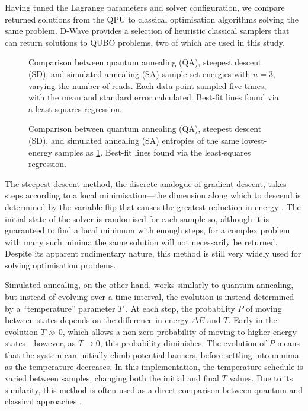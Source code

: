 \documentclass[12pt]{article}
\theoremstyle{definition}
\begin{document}
Having tuned the Lagrange parameters and solver configuration, we compare returned solutions from the QPU to classical optimisation algorithms solving the same problem. D-Wave provides a selection of heuristic classical samplers that can return solutions to QUBO problems, two of which are used in this study.

\begin{figure}[p]
    \centering\footnotesize
    
    \caption{Comparison between quantum annealing (QA), steepest descent (SD), and simulated annealing (SA) sample set energies with $n=3$, varying the number of reads. Each data point sampled five times, with the mean and standard error calculated. Best-fit lines found via a least-squares regression.}
    \label{fig:reads}
\end{figure}

\begin{figure}[p]
    \centering\footnotesize
    
    \caption{Comparison between quantum annealing (QA), steepest descent (SD), and simulated annealing (SA) entropies of the same lowest-energy samples as \cref{fig:reads}. Best-fit lines found via the least-squares regression.}
    \label{fig:entropy}
\end{figure}

The steepest descent method, the discrete analogue of gradient descent, takes steps according to a local minimisation---the dimension along which to descend is determined by the variable flip that causes the greatest reduction in energy \cite{dwave_samplers}. The initial state of the solver is randomised for each sample so, although it is guaranteed to find a local minimum with enough steps, for a complex problem with many such minima the same solution will not necessarily be returned. Despite its apparent rudimentary nature, this method is still very widely used for solving optimisation problems.

Simulated annealing, on the other hand, works similarly to quantum annealing, but instead of evolving over a time interval, the evolution is instead determined by a ``temperature'' parameter $T$ \cite{kirkpatrick_optimization_1983}. At each step, the probability $P$ of moving between states depends on the difference in energy $\Delta E$ and $T$. Early in the evolution $T\gg0$, which allows a non-zero probability of moving to higher-energy states---however, as $T\to 0$, this probability diminishes. The evolution of $P$ means that the system can initially climb potential barriers, before settling into minima as the temperature decreases. In this implementation, the temperature schedule is varied between samples, changing both the initial and final $T$ values. Due to its similarity, this method is often used as a direct comparison between quantum and classical approaches \cite{albash_demonstration_2018}.
\end{document}
